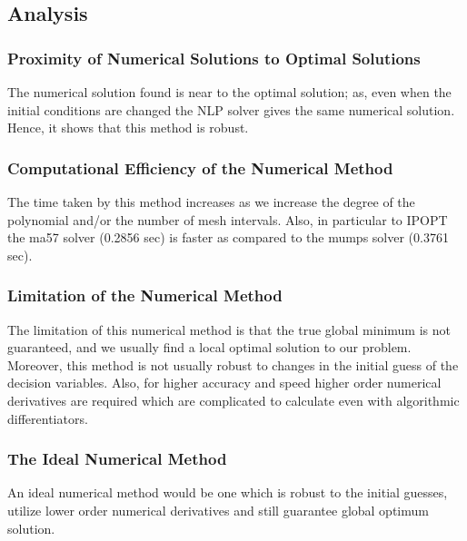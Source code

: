 \documentclass[11pt,usenames]{article}
\begin{document}
	\newpage
	
	
	\subsection{Analysis}
	\subsubsection{Proximity of Numerical Solutions to Optimal Solutions}
	The numerical solution found is near to the optimal solution; as, even when the initial conditions are changed the NLP solver gives the same numerical solution. Hence, it shows that this method is robust.
	\subsubsection{Computational Efficiency of the Numerical Method}
	The time taken by this method increases as we increase the degree of the polynomial  and/or the number of mesh intervals. Also, in particular to IPOPT the ma57 solver (0.2856 sec) is faster as compared to the mumps solver (0.3761 sec).
	\subsubsection{Limitation of the Numerical Method}
	The limitation of this numerical method is that the true global minimum is not guaranteed, and we usually find a local optimal solution to our problem. Moreover, this method is not usually robust to changes in the initial guess of the decision variables. Also, for higher accuracy and speed higher order numerical derivatives are required which are complicated to calculate even with algorithmic differentiators.
	\subsubsection{The Ideal Numerical Method}
	An ideal numerical method would be one which is robust to the initial guesses, utilize lower order numerical derivatives and still guarantee global optimum solution.
	
\end{document}
